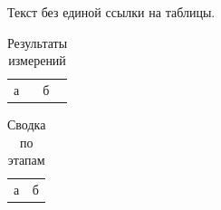 Текст без единой ссылки на таблицы.

\begin{table} %
  \caption{Результаты измерений}
  \label{tab:results}
  \begin{tabular}{ll}
    а & б \\
  \end{tabular}
\end{table}

\begin{table} %
  \caption{Сводка по этапам}
  \begin{tabular}{ll}
    а & б \\
  \end{tabular}
\end{table}
